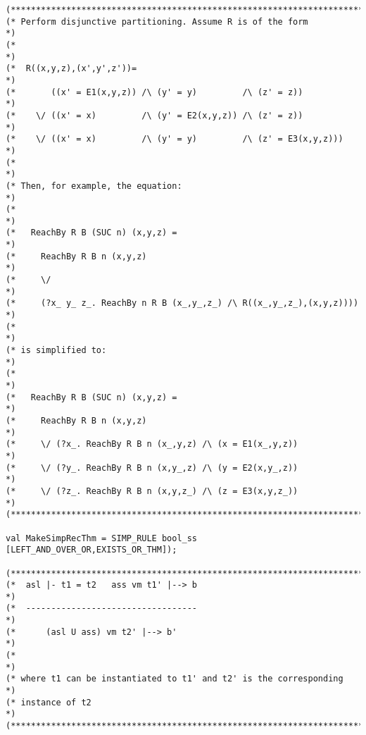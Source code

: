 \documentclass[12pt]{article}
\begin{document}
\begin{footnotesize}
\begin{Verbatim}[commandchars=\$\&\%]
(*****************************************************************************)
(* Perform disjunctive partitioning. Assume R is of the form                 *)
(*                                                                           *)
(*  R((x,y,z),(x',y',z'))=                                                   *)
(*       ((x' = E1(x,y,z)) /\ (y' = y)         /\ (z' = z))                  *)
(*    \/ ((x' = x)         /\ (y' = E2(x,y,z)) /\ (z' = z))                  *)
(*    \/ ((x' = x)         /\ (y' = y)         /\ (z' = E3(x,y,z)))          *)
(*                                                                           *)
(* Then, for example, the equation:                                          *)
(*                                                                           *)
(*   ReachBy R B (SUC n) (x,y,z) =                                           *)
(*     ReachBy R B n (x,y,z)                                                 *)
(*     \/                                                                    *)
(*     (?x_ y_ z_. ReachBy n R B (x_,y_,z_) /\ R((x_,y_,z_),(x,y,z))))       *)
(*                                                                           *)
(* is simplified to:                                                         *)
(*                                                                           *)
(*   ReachBy R B (SUC n) (x,y,z) =                                           *)
(*     ReachBy R B n (x,y,z)                                                 *)
(*     \/ (?x_. ReachBy R B n (x_,y,z) /\ (x = E1(x_,y,z))                   *)
(*     \/ (?y_. ReachBy R B n (x,y_,z) /\ (y = E2(x,y_,z))                   *)
(*     \/ (?z_. ReachBy R B n (x,y,z_) /\ (z = E3(x,y,z_))                   *)
(*****************************************************************************)

val MakeSimpRecThm = SIMP_RULE bool_ss [LEFT_AND_OVER_OR,EXISTS_OR_THM]);

(*****************************************************************************)
(*  asl |- t1 = t2   ass vm t1' |--> b                                       *)
(*  ----------------------------------                                       *)
(*      (asl U ass) vm t2' |--> b'                                           *)
(*                                                                           *)
(* where t1 can be instantiated to t1' and t2' is the corresponding          *)
(* instance of t2                                                            *)
(*****************************************************************************)


\end{Verbatim}
\end{footnotesize}
\end{document}

